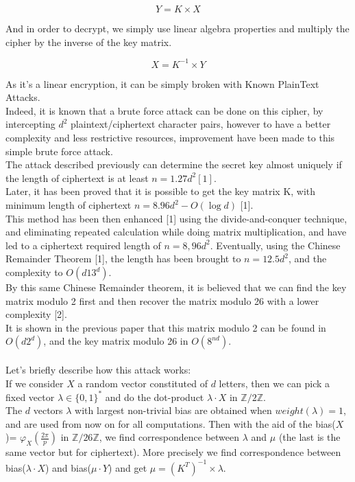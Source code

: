 \documentclass{article}
\begin{document}
$$Y=K \times X$$

And in order to decrypt, we simply use linear algebra properties and multiply the cipher by the inverse of the key matrix.

$$X = K^{-1} \times Y$$

As it's a linear encryption, it can be simply broken with Known PlainText Attacks.\\
Indeed, it is known that a brute force attack can be done on this cipher, by intercepting $d^2$ plaintext/ciphertext character pairs, however to have a better complexity and less restrictive resources, improvement have been made to this simple brute force attack.\\
The attack described previously can determine the secret key almost uniquely if the length of ciphertext is at least $n =1.27d^2 [1].$\\ 
Later, it has been proved that it is possible to get the key matrix K, with minimum length of ciphertext $n =8.96d^2 -O(\log d)$ [1].\\
This method has been then enhanced [1] using the divide-and-conquer technique, and eliminating repeated calculation while doing matrix multiplication, and have led to a ciphertext required length of $n=8,96d^2$. Eventually, using the Chinese Remainder Theorem [1], the length has been brought to $n=12.5d^2$, and the complexity to $O(d13^d)$.\\
By this same Chinese Remainder theorem, it is believed that we can find the key matrix modulo 2 first and then recover the matrix modulo 26 with a lower complexity [2].\\
It is shown in the previous paper that this matrix modulo 2 can be found in $O(d2^d)$, and the key matrix modulo 26 in $O(8^{nd})$.\\
\\
Let's briefly describe how this attack works:\\
If we consider $X$ a random vector constituted of $d$ letters, then we can pick a fixed vector $\lambda \in \{0,1\}^*$ and do the dot-product $\lambda \cdot X$ in $\mathbb{Z}/2\mathbb{Z}$.\\
The $d$ vectors $\lambda$ with largest non-trivial bias are obtained when $weight(\lambda) = 1$, and are used from now on for all computations.
Then with the aid of the bias($X$)= $\varphi_{X}(\frac{2\pi}{p})$ in $\mathbb{Z}/26\mathbb{Z}$, we find correspondence between $\lambda$ and $\mu$ (the last is the same vector but for ciphertext). More precisely we find correspondence between bias($\lambda \cdot X$) and bias($\mu \cdot Y$) and get $ \mu = (K^T)^{-1} \times\lambda $.\\
\end{document}
